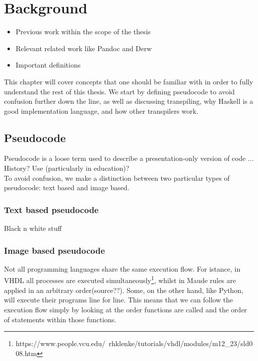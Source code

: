 \chapter{Background} %
\begin{itemize}
    \item Previous work within the scope of the thesis
    \item Relevant related work like Pandoc and Derw
    \item Important definitions
\end{itemize}

This chapter will cover concepts that one should be familiar with in order to fully understand the rest of this thesis. We start by defining pseudocode to avoid confusion further down the line, as well as discussing transpiling, why Haskell is a good implementation language, and how other transpilers work.

\section{Pseudocode}

Pseudocode is a loose term used to describe a presentation-only version of code ... \hfill \\

History? Use (particularly in education)? \hfill \\

To avoid confusion, we make a distinction between two particular types of pseudocode: text based and image based.

\subsection{Text based pseudocode}

Black n white stuff

\subsection{Image based pseudocode}

Not all programming languages share the same execution flow. For istance, in VHDL all processes are executed simultaneously\footnote{https://www.people.vcu.edu/~rhklenke/tutorials/vhdl/modules/m12\_23/sld008.htm}, whilst in Maude rules are applied in an arbitrary order(source??). Some, on the other hand, like Python, will execute their programs line for line. This means that we can follow the execution flow simply by looking at the order functions are called and the order of statements within those functions. \hfill \\

